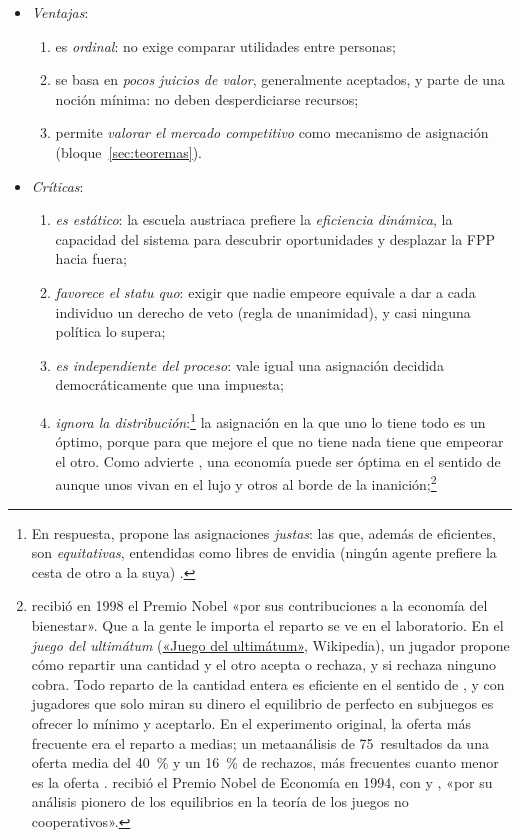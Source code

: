 \documentclass[11pt]{article}
\begin{document}
\begin{itemize}
\item \emph{Ventajas}:
  \begin{enumerate}
  \item es \emph{ordinal}: no exige comparar utilidades entre personas;
  \item se basa en \emph{pocos juicios de valor}, generalmente aceptados, y parte de una noción mínima: no deben desperdiciarse recursos;
  \item permite \emph{valorar el mercado competitivo} como mecanismo de asignación (bloque~\ref{sec:teoremas}).
  \end{enumerate}
\item \emph{Críticas}:
  \begin{enumerate}
  \item \emph{es estático}: la escuela austriaca prefiere la \emph{eficiencia dinámica}, la capacidad del sistema para descubrir oportunidades y desplazar la FPP hacia fuera\nocite{HuertaDeSoto2004Eficiencia};
  \item \emph{favorece el \emph{statu quo}}: exigir que nadie empeore equivale a dar a cada individuo un derecho de veto (regla de unanimidad), y casi ninguna política lo supera;
  \item \emph{es independiente del proceso}: vale igual una asignación decidida democráticamente que una impuesta;
  \item \emph{ignora la distribución}:\footnote{En respuesta, \textcite{Foley1967Resource} propone las asignaciones \emph{justas}: las que, además de eficientes, son \emph{equitativas}, entendidas como libres de envidia (ningún agente prefiere la cesta de otro a la suya) .} la asignación en la que uno lo tiene todo es un óptimo, porque para que mejore el que no tiene nada tiene que empeorar el otro. Como advierte \textcite{Sen1970Collective}, una economía puede ser óptima en el sentido de  aunque unos vivan en el lujo y otros al borde de la inanición;\footnote{ recibió en 1998 el Premio Nobel «por sus contribuciones a la economía del bienestar»\nocite{Nobel1998Sen}. Que a la gente le importa el reparto se ve en el laboratorio. En el \emph{juego del ultimátum}\nocite{GuthSchmittbergerSchwarze1982Ultimatum} (\href{https://es.wikipedia.org/wiki/Juego_del_ultim\%C3\%A1tum}{«Juego del ultimátum»}, Wikipedia), un jugador propone cómo repartir una cantidad y el otro acepta o rechaza, y si rechaza ninguno cobra. Todo reparto de la cantidad entera es eficiente en el sentido de , y con jugadores que solo miran su dinero el equilibrio de  perfecto en subjuegos es ofrecer lo mínimo y aceptarlo. En el experimento original, la oferta más frecuente era el reparto a medias; un metaanálisis de 75~resultados da una oferta media del 40~\% y un 16~\% de rechazos, más frecuentes cuanto menor es la oferta\nocite{OosterbeekSloofVandeKuilen2004Cultural}  .  recibió el Premio Nobel de Economía en 1994, con  y , «por su análisis pionero de los equilibrios en la teoría de los juegos no cooperativos»\nocite{Nobel1994Nash}.}

\end{enumerate}
\end{itemize}
\end{document}
